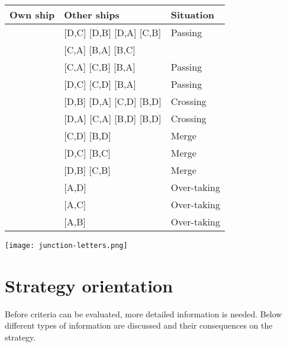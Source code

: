 \begin{minipage}{\textwidth}
	\begin{minipage}[b]{0.69\textwidth}
		\centering
		\begin{tabular}{l|l|l}
			Own ship & Other ships & Situation\\
			\hline
			\big[A,D\big] & [D,C] [D,B] [D,A] [C,B] & Passing \\
						& [C,A] [B,A] [B,C] & \\
			\big[A,C\big] & [C,A] [C,B] [B,A] & Passing \\
			\big[A,B\big] & [D,C] [C,D] [B,A] & Passing \\
			\big[A,C\big] & [D,B] [D,A] [C,D] [B,D] & Crossing \\
			\big[A,B\big] & [D,A] [C,A] [B,D] [B,D] & Crossing \\
			\big[A,D\big] & [C,D] [B,D] & Merge \\
			\big[A,C\big] & [D,C] [B,C] & Merge \\
			\big[A,B\big] & [D,B] [C,B] & Merge \\
			\big[A,D\big] & [A,D] & Over-taking \\
			\big[A,C\big] & [A,C] & Over-taking \\
			\big[A,B\big] & [A,B] & Over-taking \\
			
		\end{tabular}
		
		\label{tab:scenarios-standard}
	\end{minipage}
	\hfill
	\begin{minipage}[b]{0.3\textwidth}
		\centering
		\texttt{[image: junction-letters.png]}
		\label{fig:junction-letters}
	\end{minipage}
	
\end{minipage}

\begin{figure}[h]
	
\end{figure}


\begin{table}[h]
	
\end{table}


\section{Strategy orientation}
Before criteria can be evaluated, more detailed information is needed. Below different types of information are discussed and their consequences on the strategy.

